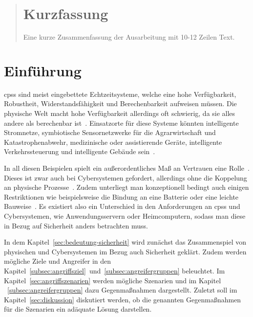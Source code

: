 \documentclass[final,bibliography=totocnumbered]{include/sikseminar}
\newcommand{\cps}{\glspl{cps}\xspace}
\begin{document}
\makeTitle

\makeAuthor
\date{Datum des Vortrags \todo}
\subject{Seminar Cyber-Physical Systems}

\maketitle

\begin{abstract}
\section*{Kurzfassung}
Eine kurze Zusammenfassung der Ausarbeitung mit 10-12 Zeilen Text.
\end{abstract}
\thispagestyle{empty}
\newpage
\tableofcontents
\newpage

\section{Einführung}\label{sec:intro}
\cps sind meist eingebettete Echtzeitsysteme, welche eine hohe Verfügbarkeit, Robustheit, Widerstandsfähigkeit und Berechenbarkeit aufweisen müssen.
Die physische Welt macht hohe Verfügbarkeit allerdings oft schwierig, da sie alles andere als berechenbar ist~\cite{Lee08,SGL+08}.
Einsatzorte für diese Systeme könnten intelligente Stromnetze, symbiotische Sensornetzwerke für die Agrarwirtschaft und Katastrophenabwehr, medizinische oder assistierende Geräte, intelligente Verkehrssteuerung und intelligente Gebäude sein~\cite{RLS+10}.

In all diesen Beispielen spielt ein außerordentliches Maß an Vertrauen eine Rolle~\cite{SGL+08}.
Dieses ist zwar auch bei Cybersystemen gefordert, allerdings ohne die Koppelung an physische Prozesse~\cite{BG11}.
Zudem unterliegt man konzeptionell bedingt auch einigen Restriktionen wie beispielsweise die Bindung an eine Batterie oder eine leichte Bauweise~\cite{YWY+17}.
Es existiert also ein Unterschied in den Anforderungen an \cps und Cybersystemen, wie Anwendungsservern oder Heimcomputern, sodass man diese in Bezug auf Sicherheit anders betrachten muss.

In dem Kapitel~\ref{sec:bedeutung-sicherheit} wird zunächst das Zusammenspiel von physischen und Cybersystemen im Bezug auch Sicherheit geklärt.
Zudem werden mögliche Ziele und Angreifer in den Kapitel~\ref{subsec:angriffsziel}~und~\ref{subsec:angreifergruppen} beleuchtet.
Im Kapitel~\ref{sec:angriffszenarien} werden mögliche Szenarien und im Kapitel ~\ref{subsec:angreifergruppen} dazu Gegenmaßnahmen dargestellt.
Zuletzt soll im Kapitel~\ref{sec:diskussion} diskutiert werden, ob die genannten Gegenmaßnahmen  für die Szenarien ein adäquate Lösung darstellen.
\end{document}
